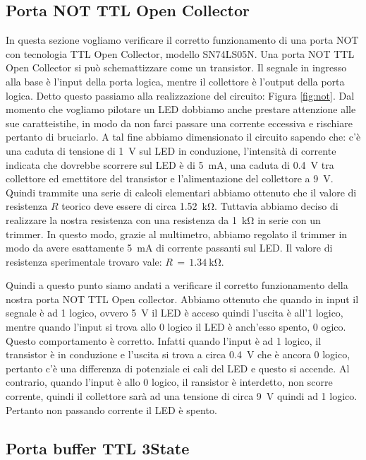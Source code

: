 \subsection*{Porta NOT TTL Open Collector}

In questa sezione vogliamo verificare il corretto funzionamento di una porta NOT con tecnologia TTL Open Collector, modello SN74LS05N. Una porta NOT TTL Open Collector si può schemattizzare come un transistor. Il segnale in ingresso alla base è l'input della porta logica, mentre il collettore è l'output della porta logica.
Detto questo passiamo alla realizzazione del circuito: Figura \ref{fig:not}.
Dal momento che vogliamo pilotare un LED dobbiamo anche prestare attenzione alle sue caratteistihe, in modo da non farci passare una corrente eccessiva e rischiare pertanto di bruciarlo. A tal fine abbiamo dimensionato il circuito sapendo che: c'è una caduta di tensione di \SI{1}{\volt} sul LED in conduzione, l'intensità di corrente indicata che dovrebbe scorrere sul LED è di \SI{5}{\milli\ampere}, una caduta di \SI{0.4}{\volt} tra collettore ed emettitore del transistor e l'alimentazione del collettore a \SI{9}{\volt}. Quindi trammite una serie di calcoli elementari abbiamo ottenuto che il valore di resistenza $R$ teorico deve essere di circa \SI{1.52}{\kilo\ohm}. Tuttavia abbiamo deciso di realizzare la nostra resistenza con una resistenza da \SI{1}{\kilo\ohm} in serie con un trimmer. In questo modo, grazie al multimetro, abbiamo regolato il trimmer in modo da avere esattamente \SI{5}{\milli\ampere} di corrente passanti sul LED. Il valore di resistenza sperimentale trovaro vale: $R\,=\,\SI{1.34}{\kilo\ohm}$.

Quindi a questo punto siamo andati a verificare il corretto funzionamento della nostra porta NOT TTL Open collector. Abbiamo ottenuto che quando in input il segnale è ad 1 logico, ovvero \SI{5}{\volt} il LED è acceso quindi l'uscita è all'1 logico, mentre quando l'input si trova allo 0 logico il LED è anch'esso spento, 0 ogico.
Questo comportamento è corretto. Infatti quando l'input è ad 1 logico, il transistor è in conduzione e l'uscita si trova a circa \SI{0.4}{\volt} che è ancora 0 logico, pertanto c'è una differenza di potenziale ei cali del LED e questo si accende. Al contrario, quando l'input è allo 0 logico, il ransistor è interdetto, non scorre corrente, quindi il collettore sarà ad una tensione di circa \SI{9}{\volt} quindi ad 1 logico. Pertanto non passando corrente il LED è spento.

\subsection*{Porta buffer TTL 3State}

